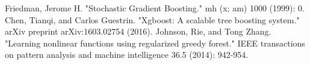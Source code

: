 \begin{tcolorbox}[title={\Large 参考文献}]
	\begin{thebibliography}{99}
			\beamertemplatetextbibitems
		 Friedman, Jerome H. "Stochastic Gradient Boosting." mh (x; am) 1000 (1999): 0.
		 Chen, Tianqi, and Carlos Guestrin. "Xgboost: A scalable tree boosting system." arXiv preprint arXiv:1603.02754 (2016).
		 Johnson, Rie, and Tong Zhang. "Learning nonlinear functions using regularized greedy forest." IEEE transactions on pattern analysis and machine intelligence 36.5 (2014): 942-954.
	\end{thebibliography}
\end{tcolorbox}
